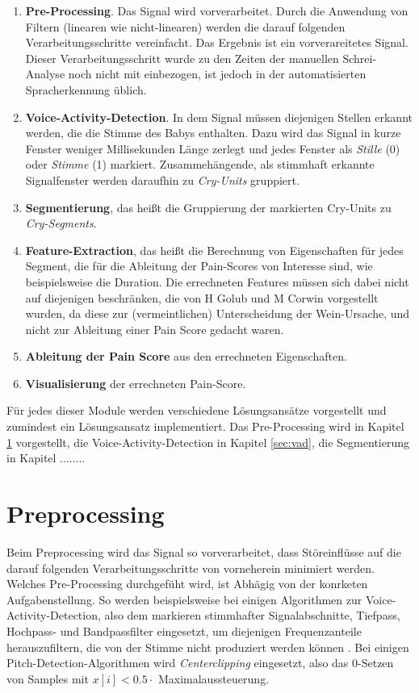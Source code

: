 \begin{enumerate}[leftmargin=*]
	\item \textbf{Pre-Processing}. Das Signal wird vorverarbeitet. Durch die Anwendung von Filtern (linearen wie nicht-linearen) werden die darauf folgenden Verarbeitungsschritte vereinfacht. Das Ergebnis ist ein vorverareitetes Signal. Dieser Verarbeitungsschritt wurde zu den Zeiten der manuellen Schrei-Analyse noch nicht mit einbezogen, ist jedoch in der automatisierten Spracherkennung üblich.
	\item \textbf{Voice-Activity-Detection}. In dem Signal müssen diejenigen Stellen erkannt werden, die die Stimme des Babys enthalten. Dazu wird das Signal in kurze Fenster weniger Millisekunden Länge zerlegt und jedes Fenster als \emph{Stille} (0) oder \emph{Stimme} (1) markiert. Zusammehängende, als stimmhaft erkannte Signalfenster werden daraufhin zu \emph{Cry-Units} gruppiert.
	\item \textbf{Segmentierung}, das heißt die Gruppierung der markierten Cry-Units zu \emph{Cry-Segments}.
	\item \textbf{Feature-Extraction}, das heißt die Berechnung von Eigenschaften für jedes Segment, die für die Ableitung der Pain-Scores von Interesse sind, wie beispielsweise die Duration. Die errechneten Features müssen sich dabei nicht auf diejenigen beschränken, die von H Golub und M Corwin \cite{cryModel} vorgestellt wurden, da diese zur (vermeintlichen) Unterscheidung der Wein-Ursache, und nicht zur Ableitung einer Pain Score gedacht waren.
	\item \textbf{Ableitung der Pain Score} aus den errechneten Eigenschaften.
	\item \textbf{Visualisierung} der errechneten Pain-Score.
\end{enumerate}

Für jedes dieser Module werden verschiedene Lösungsansätze vorgestellt und zumindest ein Lösungsansatz implementiert. Das Pre-Processing wird in Kapitel \ref{sec:preprocessing} vorgestellt, die Voice-Activity-Detection in Kapitel \ref{sec:vad}, die Segmentierung in Kapitel ........

\section{Preprocessing}
\label{sec:preprocessing}

Beim Preprocessing wird das Signal so vorverarbeitet, dass Störeinflüsse auf die darauf folgenden Verarbeitungsschritte von vorneherein minimiert werden. Welches Pre-Processing durchgefüht wird, ist Abhägig von der konrketen Aufgabenstellung. So werden beispielsweise bei einigen Algorithmen zur Voice-Activity-Detection, also dem markieren stimmhafter Signalabschnitte, Tiefpass, Hochpass- und Bandpassfilter eingesetzt, um diejenigen Frequenzanteile herauszufiltern, die von der Stimme nicht produziert werden können \cite{vad_entropy} \cite{vad_ceps} \cite{vad_kola}. Bei einigen Pitch-Detection-Algorithmen wird \emph{Centerclipping} eingesetzt, also das 0-Setzen von Samples mit $ x[i] < 0.5 \cdot $ Maximalaussteuerung.\cite{czechPitch} 

